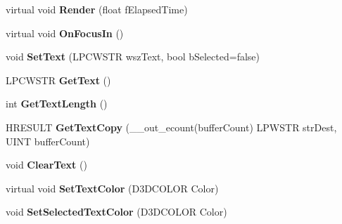\begin{DoxyCompactItemize}
\item 
\hypertarget{class_c_d_x_u_t_edit_box_a4140a840038c243d1df1635624199afb}{virtual void {\bfseries Render} (float f\+Elapsed\+Time)}\label{class_c_d_x_u_t_edit_box_a4140a840038c243d1df1635624199afb}

\item 
\hypertarget{class_c_d_x_u_t_edit_box_adc767031600f1ea99ebcf533e00d7948}{virtual void {\bfseries On\+Focus\+In} ()}\label{class_c_d_x_u_t_edit_box_adc767031600f1ea99ebcf533e00d7948}

\item 
\hypertarget{class_c_d_x_u_t_edit_box_a3ef3e3ef8a085258ba6bb69285505924}{void {\bfseries Set\+Text} (L\+P\+C\+W\+S\+T\+R wsz\+Text, bool b\+Selected=false)}\label{class_c_d_x_u_t_edit_box_a3ef3e3ef8a085258ba6bb69285505924}

\item 
\hypertarget{class_c_d_x_u_t_edit_box_a7d20deae894a3a0259a2e9fca551371d}{L\+P\+C\+W\+S\+T\+R {\bfseries Get\+Text} ()}\label{class_c_d_x_u_t_edit_box_a7d20deae894a3a0259a2e9fca551371d}

\item 
\hypertarget{class_c_d_x_u_t_edit_box_a2bb1d1ebe99c30ef317824e852882126}{int {\bfseries Get\+Text\+Length} ()}\label{class_c_d_x_u_t_edit_box_a2bb1d1ebe99c30ef317824e852882126}

\item 
\hypertarget{class_c_d_x_u_t_edit_box_a054ecab68953966af455e4f9ef7df87d}{H\+R\+E\+S\+U\+L\+T {\bfseries Get\+Text\+Copy} (\+\_\+\+\_\+out\+\_\+ecount(buffer\+Count) L\+P\+W\+S\+T\+R str\+Dest, U\+I\+N\+T buffer\+Count)}\label{class_c_d_x_u_t_edit_box_a054ecab68953966af455e4f9ef7df87d}

\item 
\hypertarget{class_c_d_x_u_t_edit_box_a769bc1130895f3d116b45a4f25bc3b78}{void {\bfseries Clear\+Text} ()}\label{class_c_d_x_u_t_edit_box_a769bc1130895f3d116b45a4f25bc3b78}

\item 
\hypertarget{class_c_d_x_u_t_edit_box_a7240aa451e6662077671f754f331edfa}{virtual void {\bfseries Set\+Text\+Color} (D3\+D\+C\+O\+L\+O\+R Color)}\label{class_c_d_x_u_t_edit_box_a7240aa451e6662077671f754f331edfa}

\item 
\hypertarget{class_c_d_x_u_t_edit_box_a44d55aa688bac6e18ea8b86f8707b9b8}{void {\bfseries Set\+Selected\+Text\+Color} (D3\+D\+C\+O\+L\+O\+R Color)}\label{class_c_d_x_u_t_edit_box_a44d55aa688bac6e18ea8b86f8707b9b8}


\end{DoxyCompactItemize}
